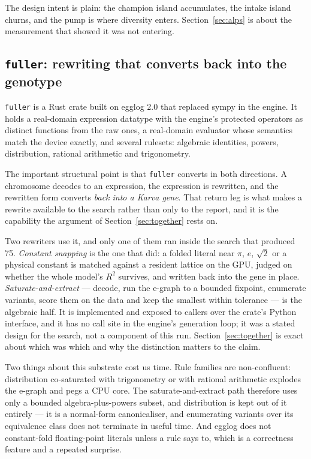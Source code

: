 \documentclass[11pt,a4paper]{article}
\begin{document}
The design intent is plain: the champion island accumulates, the intake island
churns, and the pump is where diversity enters. Section~\ref{sec:alps} is about
the measurement that showed it was not entering.

\subsection{\texttt{fuller}: rewriting that converts back into the genotype}
\label{sec:rewriting}

\texttt{fuller} is a Rust crate built on egglog 2.0 that replaced sympy in the
engine. It holds a real-domain expression datatype with the engine's protected
operators as distinct functions from the raw ones, a real-domain evaluator whose
semantics match the device exactly, and several rulesets: algebraic identities,
powers, distribution, rational arithmetic and trigonometry.

The important structural point is that \texttt{fuller} converts in both
directions. A chromosome decodes to an expression, the expression is rewritten,
and the rewritten form converts \emph{back into a Karva gene}. That return leg
is what makes a rewrite available to the search rather than only to the report,
and it is the capability the argument of Section~\ref{sec:together} rests on.

Two rewriters use it, and only one of them ran inside the search that produced
75. \emph{Constant snapping} is the one that did: a folded literal near $\pi$,
$e$, $\sqrt2$ or a physical constant is matched against a resident lattice on
the GPU, judged on whether the whole model's $R^2$ survives, and written back
into the gene in place. \emph{Saturate-and-extract} --- decode, run the
e-graph to a bounded fixpoint, enumerate variants, score them on the data and
keep the smallest within tolerance --- is the algebraic half. It is implemented
and exposed to callers over the crate's Python interface, and it has no call
site in the engine's generation loop; it was a stated design for the search, not
a component of this run. Section~\ref{sec:together} is exact about which was
which and why the distinction matters to the claim.

Two things about this substrate cost us time. Rule
families are non-confluent: distribution co-saturated with trigonometry or with
rational arithmetic explodes the e-graph and pegs a CPU core. The
saturate-and-extract path therefore uses only a bounded algebra-plus-powers
subset, and
distribution is kept out of it entirely --- it is a normal-form canonicaliser,
and enumerating variants over its equivalence class does not terminate in useful
time. And egglog does not constant-fold floating-point literals unless a rule
says to, which is a correctness feature and a repeated surprise.
\end{document}
